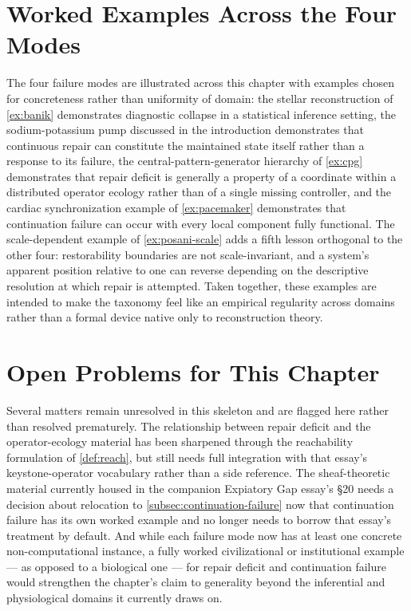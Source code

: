 \documentclass[12pt]{report}
\begin{document}
\section{Worked Examples Across the Four Modes}

The four failure modes are illustrated across this chapter with examples
chosen for concreteness rather than uniformity of domain: the stellar
reconstruction of \cref{ex:banik} demonstrates diagnostic collapse in a
statistical inference setting, the sodium-potassium pump discussed in the
introduction demonstrates that continuous repair can constitute the
maintained state itself rather than a response to its failure, the
central-pattern-generator hierarchy of \cref{ex:cpg} demonstrates that
repair deficit is generally a property of a coordinate within a
distributed operator ecology rather than of a single missing controller,
and the cardiac synchronization example of \cref{ex:pacemaker}
demonstrates that continuation failure can occur with every local
component fully functional. The scale-dependent example of
\cref{ex:posani-scale} adds a fifth lesson orthogonal to the other four:
restorability boundaries are not scale-invariant, and a system's
apparent position relative to one can reverse depending on the
descriptive resolution at which repair is attempted. Taken together,
these examples are intended to make the taxonomy feel like an empirical
regularity across domains rather than a formal device native only to
reconstruction theory.

\section{Open Problems for This Chapter}

Several matters remain unresolved in this skeleton and are flagged here
rather than resolved prematurely. The relationship between repair deficit
and the operator-ecology material has been sharpened through the
reachability formulation of \cref{def:reach}, but still needs full
integration with that essay's keystone-operator vocabulary rather than a
side reference. The sheaf-theoretic material currently housed in the
companion Expiatory Gap essay's \S20 needs a decision about relocation to
\cref{subsec:continuation-failure} now that continuation failure has its
own worked example and no longer needs to borrow that essay's treatment
by default. And while each failure mode now has at least one concrete
non-computational instance, a fully worked civilizational or institutional
example --- as opposed to a biological one --- for repair deficit and
continuation failure would strengthen the chapter's claim to generality
beyond the inferential and physiological domains it currently draws on.
\end{document}
